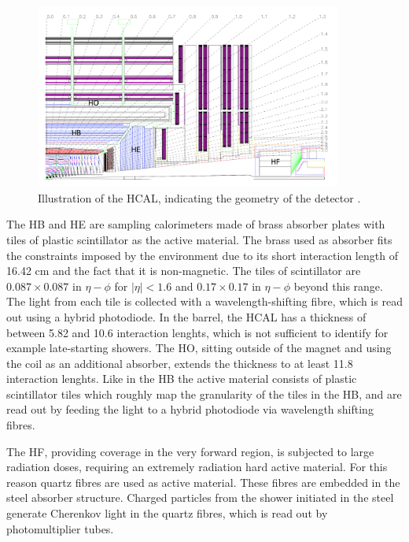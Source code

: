 \begin{figure}[h!]
\begin{center}
\includegraphics[width=0.9\textwidth]{./Detector/Plots/HCAL.png}
\caption{Illustration of the \ac{HCAL}, indicating the geometry
of the detector \cite{cms-jinst}.}
\label{fig:CMS_HCAL}
\end{center}
\end{figure}

The \ac{HB} and \ac{HE} are sampling calorimeters made of brass absorber
plates with tiles of plastic scintillator as the active material. The brass used as 
absorber fits the constraints imposed by the environment due to its short interaction length
of 16.42 cm and the fact that it is non-magnetic. The tiles of scintillator 
are $0.087 \times 0.087$ in $\eta-\phi$ for $|\eta|<1.6$ and $0.17\times0.17$ in $\eta-\phi$
beyond this range. 
The light from each tile is collected with a wavelength-shifting fibre, 
which is read out using a hybrid photodiode. In the barrel, the \ac{HCAL}
has a thickness of between 5.82 and 10.6 interaction lenghts, which is not 
sufficient to identify for example late-starting showers. The \ac{HO}, sitting
outside of the magnet and using the coil as an additional absorber, extends the 
thickness to at least 11.8 interaction lenghts. 
Like in the \ac{HB} the active material consists of plastic scintillator tiles which roughly
map the granularity of the tiles in the \ac{HB}, and are read out by feeding the light
to a hybrid photodiode via wavelength shifting fibres.

The \ac{HF}, providing coverage in the very forward region, is 
subjected to large radiation doses, requiring an extremely
radiation hard active material. For this reason quartz
fibres are used as active material. These fibres are embedded
in the steel absorber structure. Charged particles from the
shower initiated in the steel generate Cherenkov light in 
the quartz fibres, which is read out by photomultiplier tubes.

